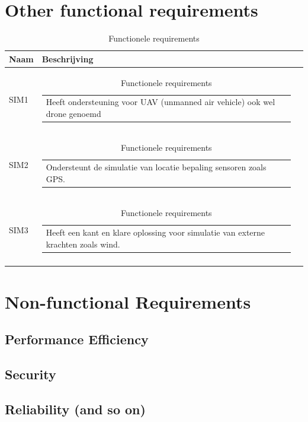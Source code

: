 \documentclass[a4paper, 11pt, oneside]{report}
\begin{document}
\chapter{Other functional requirements }

\begin{longtable}{|l|l|l|}
	\hline
	\rowcolor[HTML]{C0C0C0} 
	Naam & Beschrijving \\ \hline
	\endhead
	\hypertarget{SIM1}{SIM1}		&\begin{tabular}[c]{@{}l@{}}Heeft ondersteuning voor UAV (unmanned air vehicle) ook wel drone genoemd\end{tabular} \\ \hline
	\hypertarget{SIM2}{SIM2}		&\begin{tabular}[c]{@{}l@{}}Ondersteunt de simulatie van locatie bepaling sensoren zoals GPS.\end{tabular}        \\ \hline
	\hypertarget{SIM3}{SIM3}		&\begin{tabular}[c]{@{}l@{}}Heeft een kant en klare oplossing voor simulatie van externe krachten zoals wind.\end{tabular}        \\ \hline	
	\caption{Functionele requirements}
	\label{tab:criteria}
\end{longtable}


\chapter{Non-functional Requirements}
\section{Performance Efficiency}
\section{Security}
\section{Reliability (and so on)}






\clearpage
\appendix
\end{document}
